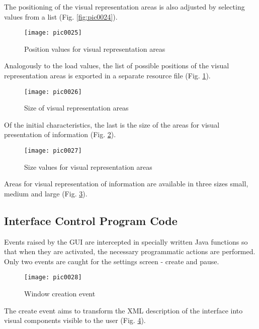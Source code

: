 The positioning of the visual representation areas is also adjusted by selecting values from a list (Fig. \ref{fig:pic0024}).

\begin{figure}[h]
\centering
\texttt{[image: pic0025]}
\caption{Position values for visual representation areas}
\label{fig:pic0025}
\end{figure}
\FloatBarrier

Analogously to the load values, the list of possible positions of the visual representation areas is exported in a separate resource file (Fig. \ref{fig:pic0025}).

\begin{figure}[h]
\centering
\texttt{[image: pic0026]}
\caption{Size of visual representation areas}
\label{fig:pic0026}
\end{figure}
\FloatBarrier

Of the initial characteristics, the last is the size of the areas for visual presentation of information (Fig. \ref{fig:pic0026}).

\begin{figure}[h]
\centering
\texttt{[image: pic0027]}
\caption{Size values for visual representation areas}
\label{fig:pic0027}
\end{figure}
\FloatBarrier

Areas for visual representation of information are available in three sizes small, medium and large (Fig. \ref{fig:pic0027}).

\subsection{Interface Control Program Code}

Events raised by the GUI are intercepted in specially written Java functions so that when they are activated, the necessary programmatic actions are performed. Only two events are caught for the settings screen - create and pause.

\begin{figure}[h]
\centering
\texttt{[image: pic0028]}
\caption{Window creation event}
\label{fig:pic0028}
\end{figure}
\FloatBarrier

The create event aims to transform the XML description of the interface into visual components visible to the user (Fig. \ref{fig:pic0028}).

